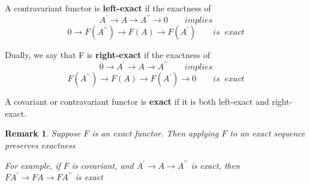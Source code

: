 \documentclass{article}
\newtheorem{remark}[theorem]{Remark}
\begin{document}
A contravariant functor is \textbf{left-exact} if the exactness of
$$
 A^\prime\rightarrow A\rightarrow A^{\prime\prime}
 \rightarrow 0
 \quad\quad implies
$$
$$
0\rightarrow 
F(A^{\prime\prime})\rightarrow F(A)\rightarrow F(A^{\prime})
\quad\quad is\;\; exact
$$

Dually, we say that F is \textbf{right-exact} if the exactness of
$$
0\rightarrow A^\prime\rightarrow A\rightarrow A^{\prime\prime}
\quad\quad implies
$$
$$
F(A^{\prime\prime})\rightarrow F(A)\rightarrow F(A^{\prime})
\rightarrow 0
\quad\quad is\;\; exact
$$

A covariant or contravariant functor is \textbf{exact} if it is both left-exact and right-exact.
\begin{remark}
    Suppose $F$ is an exact functor. Then applying $F$ to an exact sequence preserves exactness
    
    For example, if $F$ is covariant, and $A^\prime \rightarrow A \rightarrow A^{\prime\prime}$ is exact, then $FA^\prime \rightarrow FA \rightarrow FA^{\prime\prime}$ is exact
\end{remark}
\end{document}
